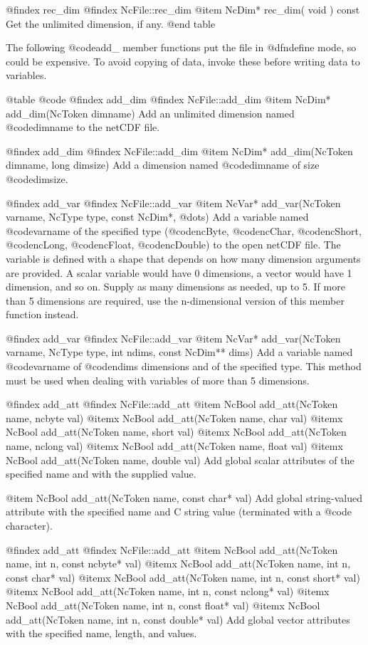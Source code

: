 @findex rec_dim
@findex NcFile::rec_dim
@item NcDim* rec_dim( void ) const
Get the unlimited dimension, if any.
@end table

The following @code{add_} member functions put the file in @dfn{define
mode}, so could be expensive.  To avoid copying of data, invoke
these before writing data to variables.

@table @code
@findex add_dim
@findex NcFile::add_dim
@item NcDim* add_dim(NcToken dimname)
Add an unlimited dimension named @code{dimname} to the netCDF file.

@findex add_dim
@findex NcFile::add_dim
@item NcDim* add_dim(NcToken dimname, long dimsize)
Add a dimension named @code{dimname} of size @code{dimsize}.

@findex add_var
@findex NcFile::add_var
@item NcVar* add_var(NcToken varname, NcType type, const NcDim*, @dots{})
Add a variable named @code{varname} of the specified type
(@code{ncByte}, @code{ncChar}, @code{ncShort}, @code{ncLong},
@code{ncFloat}, @code{ncDouble}) to the open netCDF file.  The variable
is defined with a shape that depends on how many
dimension arguments are provided.  A scalar variable would have 0
dimensions, a vector would have 1 dimension, and so on.  Supply as many
dimensions as needed, up to 5.  If more than 5 dimensions are required,
use the n-dimensional version of this member function instead.

@findex add_var
@findex NcFile::add_var
@item NcVar* add_var(NcToken varname, NcType type, int ndims, const NcDim** dims)
Add a variable named @code{varname} of @code{ndims} dimensions and of
the specified type.  This method must be used when dealing with
variables of more than 5 dimensions.

@findex add_att
@findex NcFile::add_att
@item  NcBool add_att(NcToken name, ncbyte val)
@itemx NcBool add_att(NcToken name, char val)
@itemx NcBool add_att(NcToken name, short val)
@itemx NcBool add_att(NcToken name, nclong val)
@itemx NcBool add_att(NcToken name, float val)
@itemx NcBool add_att(NcToken name, double val)
Add global scalar attributes of the specified name and with the
supplied value.

@item NcBool add_att(NcToken name, const char* val)
Add global string-valued attribute with the specified name and C string
value (terminated with a @code{\0} character).

@findex add_att
@findex NcFile::add_att
@item  NcBool add_att(NcToken name, int n, const ncbyte* val)
@itemx NcBool add_att(NcToken name, int n, const char* val)
@itemx NcBool add_att(NcToken name, int n, const short* val)
@itemx NcBool add_att(NcToken name, int n, const nclong* val)
@itemx NcBool add_att(NcToken name, int n, const float* val)
@itemx NcBool add_att(NcToken name, int n, const double* val)
Add global vector attributes with the specified name, length, and values.

